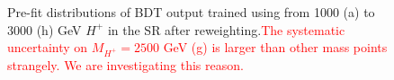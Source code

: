 \begin{figure}[H]
{        \label{fig:BDT_Hp2500_AfterRW}
    }
    \caption{Pre-fit distributions of BDT output trained using from 1000 (a) to 3000 (h) GeV $H^{+}$ in the SR after reweighting.\textcolor{red}{The systematic uncertainty on $M_{H^{+}}=2500$ GeV (g) is larger than other mass points strangely. We are investigating this reason.}}
    \label{fig:BDT_AfterRW}
\end{figure}